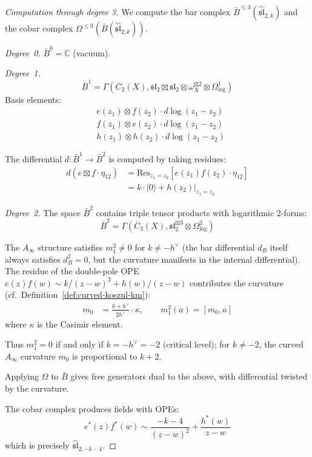 \begin{proof}[Computation through degree 3]
We compute the bar complex $\bar{B}^{\leq 3}(\widehat{\mathfrak{sl}}_{2,k})$ and the cobar complex $\Omega^{\leq 3}(\bar{B}(\widehat{\mathfrak{sl}}_{2,k}))$.

\emph{Degree~0.} $\bar{B}^0 = \mathbb{C}$ (vacuum).

\emph{Degree~1.}
\begin{equation}
\bar{B}^1 = \Gamma(\overline{C}_2(X), \mathfrak{sl}_2 \boxtimes \mathfrak{sl}_2 \otimes \omega_X^{\boxtimes 2} \otimes \Omega^1_{\log})
\end{equation}
Basis elements:
\begin{align}
&e(z_1) \otimes f(z_2) \cdot d\log(z_1-z_2) \\
&f(z_1) \otimes e(z_2) \cdot d\log(z_1-z_2) \\
&h(z_1) \otimes h(z_2) \cdot d\log(z_1-z_2)
\end{align}

The differential $d: \bar{B}^1 \to \bar{B}^2$ is computed by taking residues:
\begin{align}
d(e \boxtimes f \cdot \eta_{12}) &= \mathrm{Res}_{z_1=z_2}[e(z_1)f(z_2) \cdot \eta_{12}] \\
&= k \cdot |0\rangle + h(z_2)|_{z_1=z_2}
\end{align}

\emph{Degree~2.}
The space $\bar{B}^2$ contains triple tensor products with logarithmic 2-forms:
\begin{equation}
\bar{B}^2 = \Gamma(\overline{C}_3(X), \mathfrak{sl}_2^{\boxtimes 3} \otimes \Omega^2_{\log})
\end{equation}

The $A_\infty$ structure satisfies $m_1^2 \neq 0$ for $k \neq -h^\vee$ (the bar differential $d_B$ itself always satisfies $d_B^2 = 0$, but the curvature manifests in the internal differential).  The residue of the double-pole OPE $e(z)f(w) \sim k/(z-w)^2 + h(w)/(z-w)$ contributes the curvature (cf.\ Definition~\ref{def:curved-koszul-km}):
\begin{align}
m_0 &= \frac{k + h^\vee}{2h^\vee} \cdot \kappa, \qquad m_1^2(a) = [m_0, a]
\end{align}
where $\kappa$ is the Casimir element.

Thus $m_1^2 = 0$ if and only if $k = -h^\vee = -2$ (critical level); for $k \neq -2$, the curved $A_\infty$ curvature $m_0$ is proportional to $k+2$.

Applying $\Omega$ to $\bar{B}$ gives free generators dual to the above, with differential twisted by the curvature.

The cobar complex produces fields with OPEs:
\begin{equation}
e^*(z) f^*(w) \sim \frac{-k-4}{(z-w)^2} + \frac{h^*(w)}{z-w}
\end{equation}
which is precisely $\widehat{\mathfrak{sl}}_{2,-k-4}$.
\end{proof}

